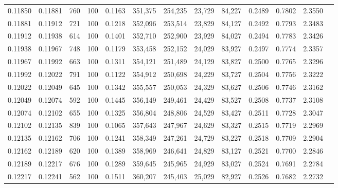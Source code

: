 \begin{tabular}{rrrrrrrrrrrrr}
0.11850 & 0.11881 &   760 & 100 &                                     0.1163 & 351,375 & 254,235 &  23,729 &  84,227 & 0.2489 & 0.7802 & 2.3550 \\
0.11881 & 0.11912 &   721 & 100 &                                     0.1218 & 352,096 & 253,514 &  23,829 &  84,127 & 0.2492 & 0.7793 & 2.3483 \\
0.11912 & 0.11938 &   614 & 100 &                                     0.1401 & 352,710 & 252,900 &  23,929 &  84,027 & 0.2494 & 0.7783 & 2.3426 \\
0.11938 & 0.11967 &   748 & 100 &                                     0.1179 & 353,458 & 252,152 &  24,029 &  83,927 & 0.2497 & 0.7774 & 2.3357 \\
0.11967 & 0.11992 &   663 & 100 &                                     0.1311 & 354,121 & 251,489 &  24,129 &  83,827 & 0.2500 & 0.7765 & 2.3296 \\
0.11992 & 0.12022 &   791 & 100 &                                     0.1122 & 354,912 & 250,698 &  24,229 &  83,727 & 0.2504 & 0.7756 & 2.3222 \\
0.12022 & 0.12049 &   645 & 100 &                                     0.1342 & 355,557 & 250,053 &  24,329 &  83,627 & 0.2506 & 0.7746 & 2.3162 \\
0.12049 & 0.12074 &   592 & 100 &                                     0.1445 & 356,149 & 249,461 &  24,429 &  83,527 & 0.2508 & 0.7737 & 2.3108 \\
0.12074 & 0.12102 &   655 & 100 &                                     0.1325 & 356,804 & 248,806 &  24,529 &  83,427 & 0.2511 & 0.7728 & 2.3047 \\
0.12102 & 0.12135 &   839 & 100 &                                     0.1065 & 357,643 & 247,967 &  24,629 &  83,327 & 0.2515 & 0.7719 & 2.2969 \\
0.12135 & 0.12162 &   706 & 100 &                                     0.1241 & 358,349 & 247,261 &  24,729 &  83,227 & 0.2518 & 0.7709 & 2.2904 \\
0.12162 & 0.12189 &   620 & 100 &                                     0.1389 & 358,969 & 246,641 &  24,829 &  83,127 & 0.2521 & 0.7700 & 2.2846 \\
0.12189 & 0.12217 &   676 & 100 &                                     0.1289 & 359,645 & 245,965 &  24,929 &  83,027 & 0.2524 & 0.7691 & 2.2784 \\
0.12217 & 0.12241 &   562 & 100 &                                     0.1511 & 360,207 & 245,403 &  25,029 &  82,927 & 0.2526 & 0.7682 & 2.2732 \\

\end{tabular}
